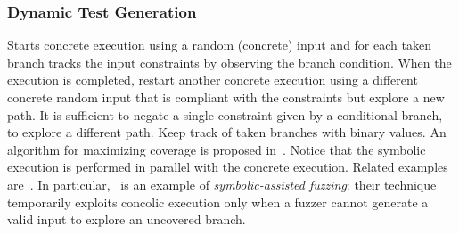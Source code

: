 \subsubsection{Dynamic Test Generation}
Starts concrete execution using a random (concrete) input and for each taken branch tracks the input constraints by observing the branch condition. When the execution is completed, restart another concrete execution using a different concrete random input that is compliant with the constraints but explore a new path. It is sufficient to negate a single constraint given by a conditional branch, to explore a different path. Keep track of taken branches with binary values. An algorithm for maximizing coverage is proposed in~\cite{DART-PLDI05}. Notice that the symbolic execution is performed in parallel with the concrete execution. Related examples are~\cite{SAGE-NDSS08,DRILLER-NDSS16}. In particular,~\cite{DRILLER-NDSS16} is an example of {\em symbolic-assisted fuzzing}: their technique temporarily exploits concolic execution only when a fuzzer cannot generate a valid input to explore an uncovered branch.

